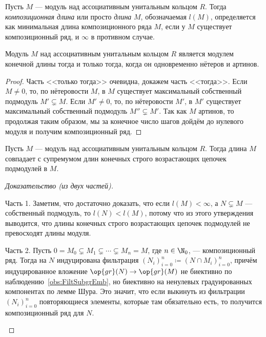 \documentclass[
	extrafontsizes,
	11pt,
	hyphens,
]{memoir}
\begin{document}
\begin{definition}
Пусть \(M\) --- модуль над ассоциативным унитальным кольцом \(R\).
Тогда \emph{композиционная длина} или просто \emph{длина} \(M\), обозначаемая \(l(M)\), определяется как минимальная длина композиционного ряда \(M\), если у \(M\) существует композиционный ряд, и \(\infty\) в противном случае.
\end{definition}

\begin{theorem}
Модуль \(M\) над ассоциативным унитальным кольцом \(R\) является модулем конечной длины тогда и только тогда, когда он одновременно нётеров и артинов.
\end{theorem}

\begin{proof}
Часть <<только тогда>> очевидна, докажем часть <<тогда>>.
Если \(M \neq 0\), то, по нётеровости \(M\), в \(M\) существует максимальный собственный подмодуль \(M' \varsubsetneq M\). Если \(M' \neq 0\), то, по нётеровости \(M'\), в \(M'\) существует максимальный собственный подмодуль \(M'' \varsubsetneq M'\).
Так как \(M\) артинов, то продолжая таким образом, мы за конечное число шагов дойдём до нулевого модуля и получим композиционный ряд.
\end{proof}

\begin{theorem}
Пусть \(M\) --- модуль над ассоциативным унитальным кольцом \(R\).
Тогда длина \(M\) совпадает с супремумом длин конечных строго возрастающих цепочек подмодулей в \(M\).
\end{theorem}

\begin{proof}[Доказательство (из двух частей)]
~\begin{proofdescription}

\item[Часть 1.]
Заметим, что достаточно доказать, что если \(l(M) < \infty\), а \(N \varsubsetneq M\) --- собственный подмодуль, то \(l(N) < l(M)\), потому что из этого утверждения выводится, что длины конечных строго возрастающих цепочек подмодулей не превосходят длины модуля.

\item[Часть 2.]
Пусть \(0 = M_0 \varsubsetneq M_1 \varsubsetneq \cdots{} \varsubsetneq M_n = M\), где \(n \in \N_0\), --- композиционный ряд.
Тогда на \(N\) индуцирована фильтрация \((N_i)_{i=0}^n \coloneqq (N \cap M_i)_{i=0}^n\), причём индуцированное вложение \(\op{gr}(N) \to \op{gr}(M)\) не биективно по наблюдению~\ref{obs:FiltSubgrEmb}, но биективно на ненулевых градуированных компонентах по лемме Шура.
Это значит, что если выкинуть из фильтрации \((N_i)_{i=0}^n\) повторяющиеся элементы, которые там обязательно есть, то получится композиционный ряд для \(N\).
\qedhere
\end{proofdescription}
\end{proof}
\end{document}
